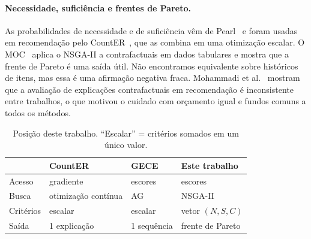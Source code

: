 \paragraph{Necessidade, suficiência e frentes de Pareto.}
As probabilidades de necessidade e de suficiência vêm de
Pearl~\cite{pearl2009causality} e foram usadas em recomendação pelo
CountER~\cite{tan2021counter}, que as combina em uma otimização escalar. O
MOC~\cite{dandl2020moc} aplica o NSGA-II a contrafactuais em dados tabulares e
mostra que a frente de Pareto é uma saída útil. Não encontramos equivalente
sobre históricos de itens, mas essa é uma afirmação negativa fraca.
Mohammadi et al.~\cite{mohammadi2025beyondtop1} mostram que a avaliação de
explicações contrafactuais em recomendação é inconsistente entre trabalhos, o
que motivou o cuidado com orçamento igual e fundos comuns a todos os métodos.

\begin{table}[t]
\caption{Posição deste trabalho. ``Escalar'' = critérios somados em um único valor.}
\label{tab:related}
\small
\begin{tabularx}{\columnwidth}{@{}lXXX@{}}
\toprule
 & \textbf{CountER} & \textbf{GECE} & \textbf{Este trabalho} \\
\midrule
Acesso      & gradiente & escores & escores \\
Busca       & otimização contínua & AG & NSGA-II \\
Critérios   & escalar & escalar & vetor $(N,S,C)$ \\
Saída       & 1 explicação & 1 sequência & frente de Pareto \\
\bottomrule
\end{tabularx}
\end{table}
